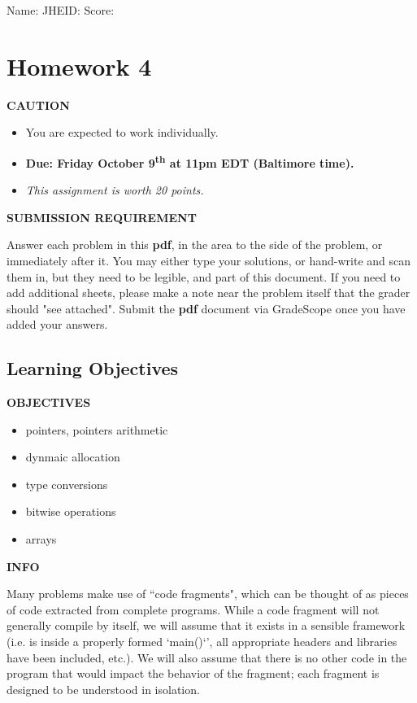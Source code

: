 \documentclass[12pt]{article}
\def \HWNumber {4}
\def \HWDueDate {Friday October 9\textsuperscript{th} at 11pm EDT (Baltimore time)}
\newenvironment{caution}{\par\begin{mdframed}[linewidth=1pt,linecolor=YellowOrange]%
		\begin{list}{}{\leftmargin=0cm}\item[\Large\bcdanger]}
		{\end{list}\end{mdframed}\par}
\newenvironment{danger}{\par\begin{mdframed}[linewidth=1pt,linecolor=Red]%
		\begin{list}{}{\leftmargin=0cm}\item[\Large\bcbombe]}
		{\end{list}\end{mdframed}\par}
\newenvironment{tip}{\par\begin{mdframed}[linewidth=1pt,linecolor=ForestGreen]%
		\begin{list}{}{\leftmargin=0cm}\item[\Large\bclampe]}
		{\end{list}\end{mdframed}\par}
\newenvironment{info}{\par\begin{mdframed}[linewidth=1pt,linecolor=Cerulean]%
		\begin{list}{}{\leftmargin=0cm}\item[\Large\bcinfo]}
		{\end{list}\end{mdframed}\par}
\def \SName {}
\def \JHEID {}
\begin{document}
\noindent Name: \framebox[5.5cm]{\SName\rule{0pt}{12pt}} \hfill
JHEID: \framebox[3cm]{\JHEID\rule{0pt}{12pt}}\hfill
Score: \framebox[2cm]{\rule{0pt}{12pt}}

\section*{Homework \HWNumber}

\begin{caution}
	\textbf{CAUTION}
	
	\begin{itemize}
		\item You are expected to work individually.
		\item \textbf{Due: \HWDueDate.}
		\item \textit{This assignment is worth 20 points. }
	\end{itemize}
\end{caution}

\begin{danger}
	\textbf{SUBMISSION REQUIREMENT}
	
	Answer each problem in this \textbf{pdf}, in the area to the side of the problem, or immediately after it.  You may either type your solutions, or hand-write and scan them in, but they need to be legible, and part of this document. If you need to add additional sheets, please make a note near the problem itself that the grader should "see attached". Submit the \textbf{pdf} document via GradeScope once you have added your answers.
\end{danger}

\subsection*{Learning Objectives}
\begin{tip}
	\textbf{OBJECTIVES}
	
	\begin{itemize}
		\item pointers, pointers arithmetic
		\item dynmaic allocation
		\item type conversions
		\item bitwise operations
		\item arrays
	\end{itemize}
\end{tip}

\begin{info}
	\textbf{INFO}
	
	Many problems make use of “code fragments", which can be thought of as pieces of code extracted from complete programs. While a code fragment will not generally compile by itself, we will assume that it exists in a sensible framework (i.e. is inside a properly formed `main()`', all appropriate headers and libraries have been included, etc.). We will also assume that there is no other code in the program that would impact the behavior of the fragment; each fragment is designed to be understood in isolation.
\end{info}
\end{document}
